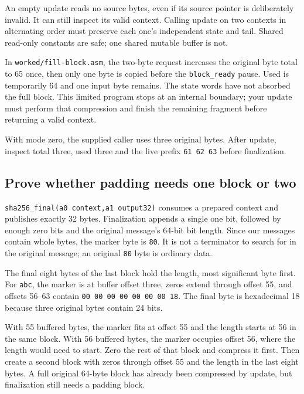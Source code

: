 An empty update reads no source bytes, even if its source pointer is deliberately
invalid. It can still inspect its valid context. Calling update on two contexts
in alternating order must preserve each one's independent state and tail.
Shared read-only constants are safe; one shared mutable buffer is not.

In \texttt{worked/fill-block.asm}, the two-byte request increases the original
byte total to 65 once, then only one byte is copied before the \texttt{block\_ready}
pause. Used is temporarily 64 and one input byte remains. The state words have
not absorbed the full block. This limited program stops at an internal boundary;
your update must perform that compression and finish the remaining fragment
before returning a valid context.

With mode zero, the supplied caller uses three original bytes. After update,
inspect total three, used three and the live prefix \texttt{61 62 63} before
finalization.

\subsection*{Prove whether padding needs one block or two}

\texttt{sha256\_final(a0 context,a1 output32)} consumes a prepared context
and publishes exactly 32 bytes. Finalization appends a single one bit, followed
by enough zero bits and the original message's 64-bit bit length. Since our
messages contain whole bytes, the marker byte is \texttt{80}. It is not a
terminator to search for in the original message; an original \texttt{80} byte
is ordinary data.

The final eight bytes of the last block hold the length, most significant byte
first. For \texttt{abc}, the marker is at buffer offset three, zeros extend
through offset 55, and offsets 56--63 contain
\texttt{00 00 00 00 00 00 00 18}. The final byte is hexadecimal 18 because
three original bytes contain 24 bits.



With 55 buffered bytes, the marker fits at offset 55 and the length starts at
56 in the same block. With 56 buffered bytes, the marker occupies offset 56,
where the length would need to start. Zero the rest of that block and compress
it first. Then create a second block with zeros through offset 55 and the
length in the last eight bytes. A full original 64-byte block has already been
compressed by update, but finalization still needs a padding block.


